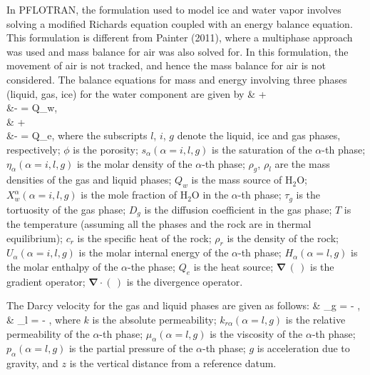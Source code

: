 In PFLOTRAN, the formulation used to model ice and water vapor
involves solving a modified Richards equation coupled with an energy balance equation. This formulation is different from Painter (2011), where a multiphase approach was used and mass balance for air was also solved for. In this formulation, the movement of air is not tracked, and hence the mass balance for air is not considered. The balance equations for mass and energy involving three phases (liquid, gas, ice) for the water component are given by
\SEQ
\BA
{}  & + \boldsymbol{\nabla} \cdot {} \nonumber\\
&- \boldsymbol{\nabla} \cdot {} = Q_w, \\
  & + \boldsymbol{\nabla} \cdot {} \nonumber\\
&- \boldsymbol{\nabla} \cdot {} = Q_e,
\EA \label{eq:balance_eqns}
\SEN 
where the subscripts $l$, $i$, $g$ denote the liquid, ice and gas phases, respectively; 
$\phi$ is the porosity; 
$s_{\alpha} (\alpha = i, l, g)$ is the saturation of the $\alpha$-th phase; 
$\eta_{\alpha} (\alpha = i, l, g)$ is the molar density of the $\alpha$-th phase; 
$\rho_g$, $\rho_l$ are the mass densities of the gas and liquid phases; $Q_w$ is the mass source of H$_2$O; 
$X_w^{\alpha} (\alpha = i, l, g)$ is the mole fraction of H$_2$O in the $\alpha$-th phase; 
$\tau_g$ is the tortuosity of the gas phase; 
$D_g$ is the diffusion coefficient in the gas phase; 
$T$ is the temperature (assuming all the phases and the rock are in thermal equilibrium); 
$c_r$ is the specific heat of the rock; 
$\rho_r$ is the density of the rock; 
$U_{\alpha} (\alpha = i, l, g)$ is the molar internal energy of the $\alpha$-th phase; 
$H_{\alpha} (\alpha = l, g)$ is the molar enthalpy of the $\alpha$-the phase; 
$Q_e$ is the heat source; 
$\boldsymbol{\nabla}\, (\, )$ is the gradient operator; 
$\boldsymbol{\nabla}\cdot (\,)$ is the divergence operator. 

The Darcy velocity for the gas and liquid phases are given as follows:
\SEQ
\BA
& _g = -  \boldsymbol{\nabla}, \\
& _l = -  \boldsymbol{\nabla}, 
\EA
\label{eq:darcy}
\SEN 
where $k$ is the absolute permeability; $k_{r \alpha} (\alpha =  l, g)$ is the relative permeability of the $\alpha$-th phase; 
$\mu_{\alpha} (\alpha =  l, g)$ is the viscosity of the $\alpha$-th phase; 
$p_{\alpha} (\alpha =  l, g)$ is the partial pressure of the $\alpha$-th phase; $g$ is acceleration due to gravity, and
$z$ is the vertical distance from a reference datum.

